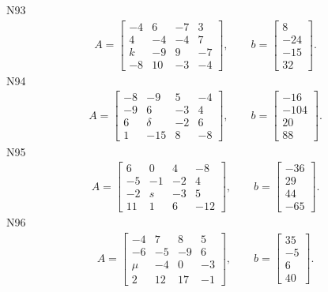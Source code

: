 \documentclass[11pt]{report}
\begin{document}
N93
\begin{align*}
 A = \left[\begin{matrix}-4 & 6 & -7 & 3\\4 & -4 & -4 & 7\\k & -9 & 9 & -7\\-8 & 10 & -3 & -4\end{matrix}\right],
\qquad b = \left[\begin{matrix}8\\-24\\-15\\32\end{matrix}\right]. 
 \end{align*}
N94
\begin{align*}
 A = \left[\begin{matrix}-8 & -9 & 5 & -4\\-9 & 6 & -3 & 4\\6 & \delta & -2 & 6\\1 & -15 & 8 & -8\end{matrix}\right],
\qquad b = \left[\begin{matrix}-16\\-104\\20\\88\end{matrix}\right]. 
 \end{align*}
N95
\begin{align*}
 A = \left[\begin{matrix}6 & 0 & 4 & -8\\-5 & -1 & -2 & 4\\-2 & s & -3 & 5\\11 & 1 & 6 & -12\end{matrix}\right],
\qquad b = \left[\begin{matrix}-36\\29\\44\\-65\end{matrix}\right]. 
 \end{align*}
N96
\begin{align*}
 A = \left[\begin{matrix}-4 & 7 & 8 & 5\\-6 & -5 & -9 & 6\\\mu & -4 & 0 & -3\\2 & 12 & 17 & -1\end{matrix}\right],
\qquad b = \left[\begin{matrix}35\\-5\\6\\40\end{matrix}\right]. 
 \end{align*}
\end{document}
